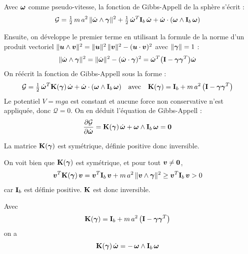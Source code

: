 \begin{proposition}
    Avec $\bm{\omega}$ comme pseudo-vitesse, la fonction de
    Gibbs-Appell de la sphère s'écrit :
    \[
        \mathcal{G} = \tfrac12\,m\,a^2\,
        \|\dot{\bm{\omega}}\wedge\bm{\gamma}\|^2
        + \tfrac12\,\dot{\bm{\omega}}^T\mathbf{I}_b\,\dot{\bm{\omega}}
        + \dot{\bm{\omega}}\cdot(\bm{\omega}\wedge\mathbf{I}_b\,
        \bm{\omega})
    \]
\end{proposition}
Ensuite, on développe le premier terme en utilisant la formule de la
norme d'un produit vectoriel
$\|\bm{u}\wedge\bm{v}\|^2 = \|\bm{u}\|^2\,\|\bm{v}\|^2
- (\bm{u}\cdot\bm{v})^2$ avec $\|\bm{\gamma}\| = 1$ :
\[
    \|\dot{\bm{\omega}}\wedge\bm{\gamma}\|^2
    = \|\dot{\bm{\omega}}\|^2
    - (\dot{\bm{\omega}}\cdot\bm{\gamma})^2
    = \dot{\bm{\omega}}^T\bigl(\mathbf{I} - \bm{\gamma}\bm{\gamma}^T
    \bigr)\dot{\bm{\omega}}
\]
On réécrit la fonction de Gibbs-Appell sous la forme :
\[
    \mathcal{G} = \tfrac12\,\dot{\bm{\omega}}^T\mathbf{K}(\bm{\gamma})
    \,\dot{\bm{\omega}}
    + \dot{\bm{\omega}}\cdot(\bm{\omega}\wedge\mathbf{I}_b\,
    \bm{\omega}) \quad \text{avec} \quad
    \mathbf{K}(\bm{\gamma}) = \mathbf{I}_b
    + m\,a^2\,\bigl(\mathbf{I} - \bm{\gamma}\bm{\gamma}^T\bigr)
\]
Le potentiel $V = m g a$ est constant et aucune force non
conservative n'est appliquée, donc $\mathcal{Q} = 0$. On en déduit
l'équation de Gibbs-Appell :
\[
    \frac{\partial \mathcal{G}}{\partial \dot{\bm{\omega}}}
    = \mathbf{K}(\bm{\gamma})\,\dot{\bm{\omega}}
    + \bm{\omega}\wedge\mathbf{I}_b\,\bm{\omega} = \bm{0}
\]
\begin{proposition}
    La matrice $\mathbf{K}(\bm{\gamma})$ est symétrique, définie positive donc inversible.
\end{proposition}
\begin{demonstration}
    On voit bien que $\mathbf{K}(\bm{\gamma})$ est symétrique,
    et pour tout $\bm{v}\neq\bm{0}$,
    \[
        \bm{v}^T\mathbf{K}(\bm{\gamma})\,\bm{v}
        = \bm{v}^T\mathbf{I}_b\,\bm{v}
        + m\,a^2\,\|\bm{v}\wedge\bm{\gamma}\|^2
        \geq \bm{v}^T\mathbf{I}_b\,\bm{v} > 0
    \]
    car $\mathbf{I}_b$ est définie positive. $\mathbf{K}$ est donc inversible.
\end{demonstration}

\begin{proposition}
    Avec
    \[
        \mathbf{K}(\bm{\gamma}) = \mathbf{I}_b
        + m\,a^2\,\bigl(\mathbf{I} - \bm{\gamma}\bm{\gamma}^T\bigr)
    \]
    on a
    \[
        \mathbf{K}(\bm{\gamma})\,\dot{\bm{\omega}}
        = -\,\bm{\omega}\wedge\mathbf{I}_b\,\bm{\omega}
    \]
\end{proposition}

